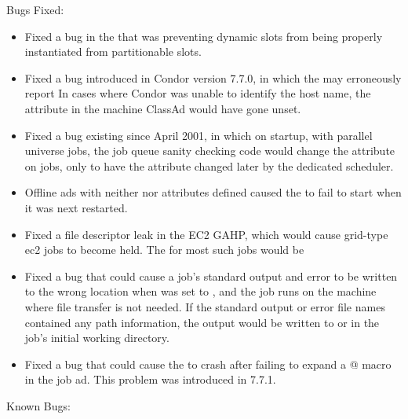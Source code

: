 \noindent Bugs Fixed:

\begin{itemize}

\item Fixed a bug in the  that was preventing dynamic slots
from being properly instantiated from partitionable slots.

\item Fixed a bug introduced in Condor version 7.7.0, 
in which the  may erroneously report 
In cases where Condor was unable to identify the host name, 
the 
attribute in the machine ClassAd would have gone unset.

\item Fixed a bug existing since April 2001,
in which on  startup, with parallel universe jobs, 
the job queue sanity checking code would change the 
attribute on jobs,
only to have the attribute changed later by the dedicated scheduler.

\item Offline ads with neither  nor  
attributes defined caused
the  to fail to start when it was next restarted.

\item Fixed a file descriptor leak in the EC2 GAHP,
 which would cause grid-type ec2 jobs to become held. 
The  for most such jobs would be 

\item Fixed a bug that could cause a job's standard output and error to
be written to the wrong location when  was
set to ,
and the job runs on the machine where file transfer is not needed.
If the standard output or error file names contained any path information,
the output would be written to  or
 in the job's initial working directory.

\item Fixed a bug that could cause the  to crash after
failing to expand a \verb@$$@ macro in the job ad.  This problem was
introduced in 7.7.1.

\end{itemize}

\noindent Known Bugs:

